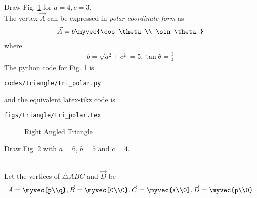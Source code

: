 \item Draw Fig. \ref{fig:tri_polar} for $a = 4, c =3$.
\label{const:tri_polar}
%
\\
\solution 
 The vertex  $\vec{A}$ can  be expressed  in {\em polar coordinate form} as
%
\begin{align}
\vec{A} = b\myvec{\cos \theta\\  \sin \theta} 
\end{align}
%
where
\begin{align}
b = \sqrt{a^2+c^2} = 5, \tan \theta = \frac{3}{4}
\end{align}
%
The python code for  Fig. \ref{fig:tri_polar} is
\begin{lstlisting}
codes/triangle/tri_polar.py
\end{lstlisting}
%
and the equivalent latex-tikz code is
%
\begin{lstlisting}
figs/triangle/tri_polar.tex
\end{lstlisting}
\begin{figure}[!ht]
\centering
\resizebox{\columnwidth}{!}{}
\caption{Right Angled Triangle}
\label{fig:tri_polar}	
\end{figure}
%
\item Draw Fig. \ref{fig:tri_sss} with $a=6$, $b=5$  and $c=4$.  
\label{const:tri_sss}
\begin{figure}[!ht]
	\begin{center}
			\resizebox{\columnwidth}{!}{}
	\end{center}
	\caption{}
	\label{fig:tri_sss}	
\end{figure}
\\
\solution Let the vertices of  $\triangle ABC$ and $\vec{D}$ be 
\begin{align}
\label{eq:tri_basic}
\vec{A} = \myvec{p\\q}, \vec{B} = \myvec{0\\0}, \vec{C} = \myvec{a\\0}, \vec{D} = \myvec{p\\0}
\end{align}
%

